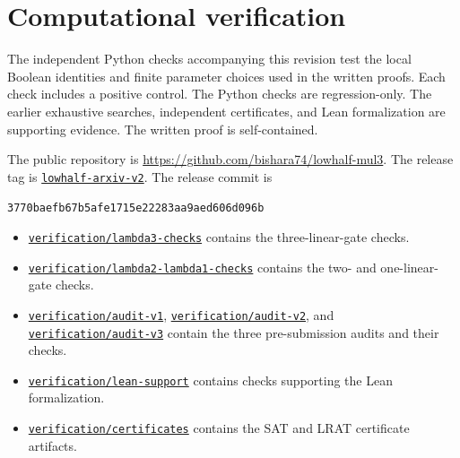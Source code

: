 \documentclass[11pt,a4paper]{article}
\theoremstyle{plain}
\theoremstyle{remark}
\theoremstyle{plain}
\newcommand{\ReleaseCommit}{3770baefb67b5afe1715e22283aa9aed606d096b}
\begin{document}
\appendix
\section{Computational verification}\label{sec:verification}
The independent Python checks accompanying this revision test the local Boolean identities and finite parameter choices used in the written proofs. Each check includes a positive control. The Python checks are regression-only. The earlier exhaustive searches, independent certificates, and Lean formalization are supporting evidence. The written proof is self-contained.

The public repository is \url{https://github.com/bishara74/lowhalf-mul3}.
The release tag is
\href{https://github.com/bishara74/lowhalf-mul3/tree/lowhalf-arxiv-v2}{\texttt{lowhalf-arxiv-v2}}.
The release commit is
\begin{center}\small\texttt{\ReleaseCommit}\end{center}
\begin{itemize}
\item \href{https://github.com/bishara74/lowhalf-mul3/tree/lowhalf-arxiv-v2/verification/lambda3-checks}{\nolinkurl{verification/lambda3-checks}} contains the three-linear-gate checks.
\item \href{https://github.com/bishara74/lowhalf-mul3/tree/lowhalf-arxiv-v2/verification/lambda2-lambda1-checks}{\nolinkurl{verification/lambda2-lambda1-checks}} contains the two- and one-linear-gate checks.
\item \href{https://github.com/bishara74/lowhalf-mul3/tree/lowhalf-arxiv-v2/verification/audit-v1}{\nolinkurl{verification/audit-v1}},
\href{https://github.com/bishara74/lowhalf-mul3/tree/lowhalf-arxiv-v2/verification/audit-v2}{\nolinkurl{verification/audit-v2}}, and
\href{https://github.com/bishara74/lowhalf-mul3/tree/lowhalf-arxiv-v2/verification/audit-v3}{\nolinkurl{verification/audit-v3}} contain the three pre-submission audits and their checks.
\item \href{https://github.com/bishara74/lowhalf-mul3/tree/lowhalf-arxiv-v2/verification/lean-support}{\nolinkurl{verification/lean-support}} contains checks supporting the Lean formalization.
\item \href{https://github.com/bishara74/lowhalf-mul3/tree/lowhalf-arxiv-v2/verification/certificates}{\nolinkurl{verification/certificates}} contains the SAT and LRAT certificate artifacts.
\end{itemize}
\end{document}
